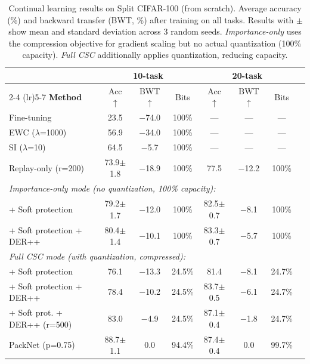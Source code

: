 \begin{table}[t]
\centering
\caption{Continual learning results on Split CIFAR-100 (from scratch). Average accuracy (\%) and backward transfer (BWT, \%) after training on all tasks. Results with $\pm$ show mean and standard deviation across 3 random seeds. \textit{Importance-only} uses the compression objective for gradient scaling but no actual quantization (100\% capacity). \textit{Full CSC} additionally applies quantization, reducing capacity.}
\label{tab:main_results}
\small
\begin{tabular}{lccccccc}
\toprule
& \multicolumn{3}{c}{\textbf{10-task}} & \multicolumn{3}{c}{\textbf{20-task}} & \\
\cmidrule(lr){2-4} \cmidrule(lr){5-7}
\textbf{Method} & Acc $\uparrow$ & BWT $\uparrow$ & Bits & Acc $\uparrow$ & BWT $\uparrow$ & Bits \\
\midrule
Fine-tuning & 23.5 & $-$74.0 & 100\% & --- & --- & --- \\
EWC ($\lambda$=1000) & 56.9 & $-$34.0 & 100\% & --- & --- & --- \\
SI ($\lambda$=10) & 64.5 & $-$5.7 & 100\% & --- & --- & --- \\
Replay-only (r=200) & 73.9$\pm$1.8 & $-$18.9 & 100\% & 77.5 & $-$12.2 & 100\% \\
\midrule
\multicolumn{7}{l}{\textit{Importance-only mode (no quantization, 100\% capacity):}} \\
\quad + Soft protection & 79.2$\pm$1.7 & $-$12.0 & 100\% & 82.5$\pm$0.7 & $-$8.1 & 100\% \\
\quad + Soft protection + DER++ & 80.4$\pm$1.4 & $-$10.1 & 100\% & 83.3$\pm$0.7 & $-$5.7 & 100\% \\
\midrule
\multicolumn{7}{l}{\textit{Full CSC mode (with quantization, compressed):}} \\
\quad + Soft protection & 76.1 & $-$13.3 & 24.5\% & 81.4 & $-$8.1 & 24.7\% \\
\quad + Soft protection + DER++ & 78.4 & $-$10.2 & 24.5\% & 83.7$\pm$0.5 & $-$6.1 & 24.7\% \\
\quad + Soft prot. + DER++ (r=500) & 83.0 & $-$4.9 & 24.5\% & 87.1$\pm$0.4 & $-$1.8 & 24.7\% \\
\midrule
PackNet (p=0.75) & 88.7$\pm$1.1 & 0.0 & 94.4\% & 87.4$\pm$0.4 & 0.0 & 99.7\% \\
\bottomrule
\end{tabular}
\end{table}
